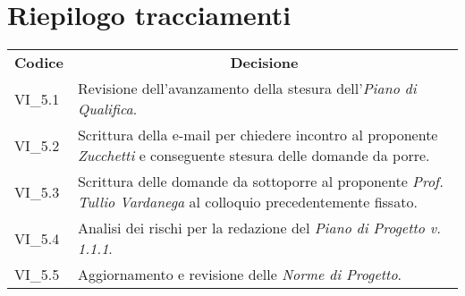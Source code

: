 
\section{Riepilogo tracciamenti}
\begin{longtable} {
		>{\centering}p{17mm} 
		>{}p{120mm}}
	\rowcolor{gray!50}
	\textbf{Codice} & \multicolumn{1}{c}{\textbf{Decisione}} \\%
	VI\_5.1 & Revisione dell'avanzamento della stesura dell'\textit{Piano di Qualifica}. \TBstrut \\ [2mm]
	VI\_5.2 & Scrittura della e-mail per chiedere incontro al proponente \textit{Zucchetti} e conseguente stesura delle domande da porre. \TBstrut \\ [2mm]
	VI\_5.3 & Scrittura delle domande da sottoporre al proponente \textit{Prof. Tullio Vardanega} al colloquio precedentemente fissato. \TBstrut \\ [2mm]
	VI\_5.4 & Analisi dei rischi per la redazione del \textit{Piano di Progetto v. 1.1.1}. \TBstrut \\ [2mm]
	VI\_5.5 & Aggiornamento e revisione delle \textit{Norme di Progetto}. \TBstrut \\ [2mm]
\end{longtable}